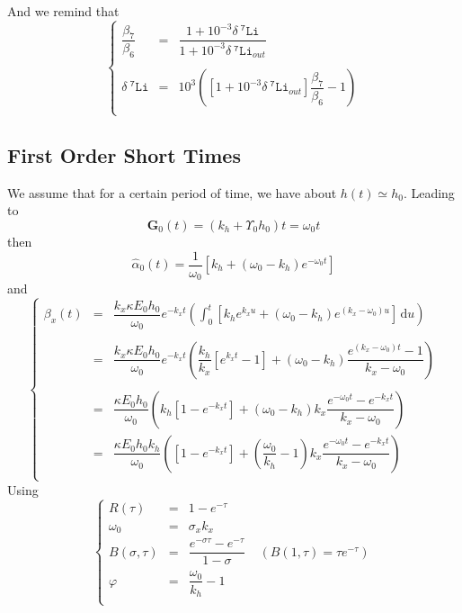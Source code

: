 \documentclass[aps,onecolumn,12pt]{revtex4}
\newcommand{\mychem}[1]{\mathtt{#1}}
\newcommand{\spLi}[1]{{~^{\mychem{#1}}\mychem{Li}}}
\newcommand{\deltaLi}{ {\delta\!\!\!\spLi{7}} }
\newcommand{\ig}{\ensuremath{\mathbf{G}}}
\begin{document}
And we remind that
\begin{equation}
\left\lbrace
\begin{array}{rcl}
	\dfrac{\beta_7}{\beta_6} & = & \dfrac{1+10^{-3}\deltaLi}{1+10^{-3}\deltaLi_{out}} \\
	\\
	\deltaLi & = & 10^3 \left( \left[1+10^{-3}\deltaLi_{out}\right] \dfrac{\beta_7}{\beta_6} - 1 \right)\\
\end{array}
\right.
\end{equation}

\subsection{First Order Short Times}
We assume that for a certain period of time, we have about $h(t)\simeq h_0$.
Leading to
\begin{equation}
	\ig_0(t) = (k_h+\Upsilon_0h_0) t = \omega_0 t
\end{equation}
then
\begin{equation}
\hat\alpha_0(t) = \dfrac{1}{\omega_0}\left[ k_h + \left(\omega_0 - k_h\right) e^{-\omega_0t}\right]
\end{equation}
and
\begin{equation}
\left\lbrace
\begin{array}{rcl}
\beta_x(t) & = & \displaystyle
\dfrac{k_x \kappa E_0 h_0}{\omega_0}  e^{-k_xt}  \left(
\int_0^t \left[ k_h e^{k_xu} + \left(\omega_0-k_h\right) e^{\left(k_x-\omega_0\right)u}\right] \, \mathrm{d} u\right) \\
\\
 & = & 
 \displaystyle
\dfrac{k_x \kappa E_0 h_0}{\omega_0}  e^{-k_xt}  \left(
\dfrac{k_h}{k_x} \left[ e^{k_xt} -1 \right] + \left(\omega_0-k_h\right) \dfrac{ e^{\left(k_x-\omega_0\right)t}-1}{k_x-\omega_0}
\right)
 \\
 \\
  & = & \dfrac{\kappa E_0 h_0}{\omega_0} 
  \left( 
  k_h \left[1-e^{-k_xt}\right] 
  + \left(\omega_0-k_h\right) k_x \dfrac{e^{-\omega_0t} - e^{-k_xt}}{k_x-\omega_0}
  \right) \\
  & = & 
 \dfrac{\kappa E_0 h_0 k_h}{\omega_0} 
  \left( 
   \left[1-e^{-k_xt}\right] 
  + \left(\dfrac{\omega_0}{k_h}-1\right) k_x \dfrac{e^{-\omega_0t} - e^{-k_xt}}{k_x-\omega_0}
  \right) \\\end{array}
\right.
\end{equation}
Using
\begin{equation}
\left\lbrace
\begin{array}{rcl}
	R(\tau) & = &1-e^{-\tau} \\
	\omega_0 & = &\sigma_x k_x\\
	 B(\sigma,\tau) & = & \dfrac{e^{-\sigma\tau}-e^{-\tau}}{1-\sigma} \;\;\;\; (B(1,\tau)=\tau e^{-\tau})\\
	 \varphi        & = & \dfrac{\omega_0}{k_h} - 1 \\
\end{array}
\right.
\end{equation}
\end{document}
